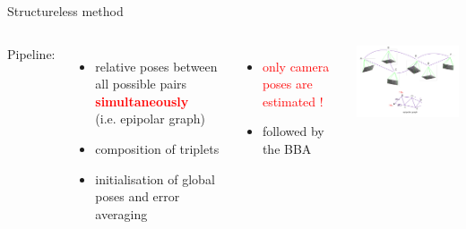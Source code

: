 \documentclass{beamer}
\begin{document}
		\begin{frame}{Structureless method}
	    
		\begin{columns}
			\setlength{\unitlength}{1cm}
			\hspace{1cm}
%
		Pipeline:
		\begin{itemize} 
			\item \footnotesize relative poses between all possible pairs \textcolor{red}{\textbf{simultaneously}}\\ (i.e. epipolar graph) 
			\item \footnotesize composition of triplets
			\item \footnotesize initialisation of global poses and error averaging
		\end{itemize}
%  
		\vspace{0.5cm}
    	\footnotesize 
		\begin{itemize}
			\item<2-> \textcolor{red}{only camera poses are estimated !}
			\item<2-> followed by the BBA
		\end{itemize}

		\setlength{\unitlength}{1cm}
		\includegraphics[width=7.5cm]{images/graph.pdf} 

		\end{columns}
		 
		\end{frame}	
		
\end{document}
